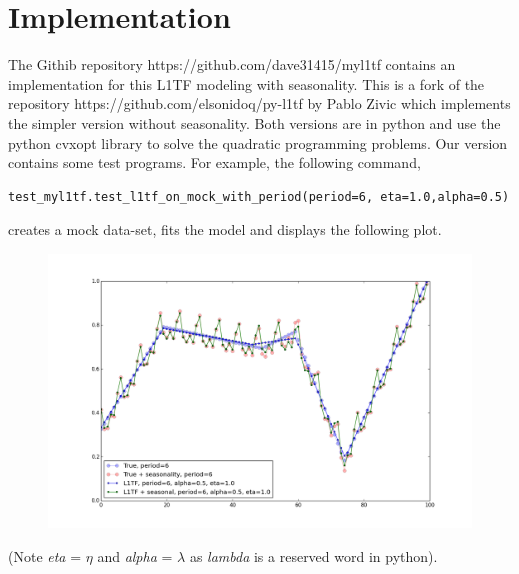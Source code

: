 \documentclass{article}
\begin{document}
\section{Implementation}
The Githib repository https://github.com/dave31415/myl1tf contains an implementation for this
L1TF modeling with seasonality. This is a fork of the repository
https://github.com/elsonidoq/py-l1tf by Pablo Zivic which implements the
simpler version without seasonality. Both versions are in python and
use the python cvxopt library to solve the quadratic programming problems. Our
version contains some test programs. For example, the following command,
\begin{verbatim}
test_myl1tf.test_l1tf_on_mock_with_period(period=6, eta=1.0,alpha=0.5)
\end{verbatim}
creates a mock data-set, fits the model and displays the following plot.
\begin{figure}
\centering
\includegraphics[width=500pt]{example.png}
\end{figure}
(Note \emph{eta} = $\eta$ and \emph{alpha} = $\lambda$ as \emph{lambda} is a reserved word in python).
\end{document}
